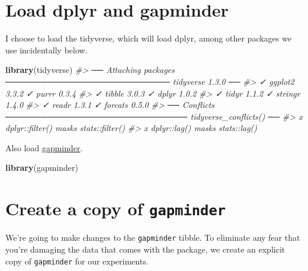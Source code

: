 \documentclass[
]{book}
\newenvironment{Shaded}{\begin{snugshade}}{\end{snugshade}}
\newcommand{\CommentTok}[1]{\textcolor[rgb]{0.56,0.35,0.01}{\textit{#1}}}
\newcommand{\KeywordTok}[1]{\textcolor[rgb]{0.13,0.29,0.53}{\textbf{#1}}}
\newcommand{\NormalTok}[1]{#1}
\begin{document}
\hypertarget{load-dplyr-and-gapminder}{%
\section{Load dplyr and gapminder}\label{load-dplyr-and-gapminder}}

I choose to load the tidyverse, which will load dplyr, among other packages we use incidentally below.

\begin{Shaded}
\begin{Highlighting}[]
\KeywordTok{library}\NormalTok{(tidyverse)}
\CommentTok{#> ── Attaching packages ──────────────────────────── tidyverse 1.3.0 ──}
\CommentTok{#> ✓ ggplot2 3.3.2     ✓ purrr   0.3.4}
\CommentTok{#> ✓ tibble  3.0.3     ✓ dplyr   1.0.2}
\CommentTok{#> ✓ tidyr   1.1.2     ✓ stringr 1.4.0}
\CommentTok{#> ✓ readr   1.3.1     ✓ forcats 0.5.0}
\CommentTok{#> ── Conflicts ─────────────────────────────── tidyverse_conflicts() ──}
\CommentTok{#> x dplyr::filter() masks stats::filter()}
\CommentTok{#> x dplyr::lag()    masks stats::lag()}
\end{Highlighting}
\end{Shaded}

Also load \href{https://github.com/jennybc/gapminder}{gapminder}.

\begin{Shaded}
\begin{Highlighting}[]
\KeywordTok{library}\NormalTok{(gapminder)}
\end{Highlighting}
\end{Shaded}

\hypertarget{create-a-copy-of-gapminder}{%
\section{\texorpdfstring{Create a copy of \texttt{gapminder}}{Create a copy of gapminder}}\label{create-a-copy-of-gapminder}}

We're going to make changes to the \texttt{gapminder} tibble. To eliminate any fear that you're damaging the data that comes with the package, we create an explicit copy of \texttt{gapminder} for our experiments.
\end{document}
